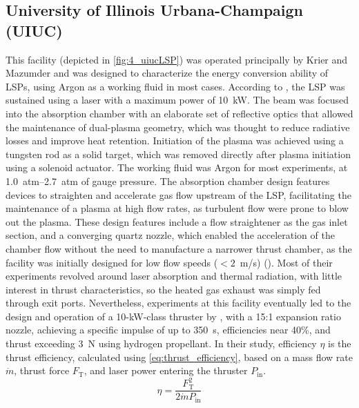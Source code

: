         \subsection{University of Illinois Urbana-Champaign (UIUC)}
            This facility (depicted in \autoref{fig:4_uiucLSP}) was operated principally by Krier and Mazumder and was designed to characterize the energy conversion ability of LSPs, using Argon as a working fluid in most cases. According to \textcite{schwartzLasersustainedGasPlasmas1989}, the LSP was sustained using a  laser with a maximum power of \qty{10}{kW}. The beam was focused into the absorption chamber with an elaborate set of reflective optics that allowed the maintenance of dual-plasma geometry, which was thought to reduce radiative losses and improve heat retention. Initiation of the plasma was achieved using a tungsten rod as a solid target, which was removed directly after plasma initiation using a solenoid actuator. The working fluid was Argon for most experiments, at \qtyrange{1.0}{2.7}{atm} of gauge pressure. The absorption chamber design features devices to straighten and accelerate gas flow upstream of the LSP, facilitating the maintenance of a plasma at high flow rates, as turbulent flow were prone to blow out the plasma. These design features include a flow straightener as the gas inlet section, and a converging quartz nozzle, which enabled the acceleration of the chamber flow without the need to manufacture a narrower thrust chamber, as the facility was initially designed for low flow speeds ($< 2$~m/s) (\textcite{krierEnergyConversionMeasurements1988}). Most of their experiments revolved around laser absorption and thermal radiation, with little interest in thrust characteristics, so the heated gas exhaust was simply fed through exit ports. Nevertheless, experiments at this facility eventually led to the design and operation of a 10-kW-class thruster by \textcite{blackLaserPropulsion10kW1995}, with a 15:1 expansion ratio nozzle, achieving a specific impulse of up to 350~s, efficiencies near 40\%, and thrust exceeding 3~N using hydrogen propellant. In their study, efficiency $\eta$ is the thrust efficiency, calculated using \autoref{eq:thrust_efficiency}, based on a mass flow rate $\dot{m}$, thrust force $F_\mathrm{T}$, and laser power entering the thruster $P_\mathrm{in}$.
            \begin{equation} \label{eq:thrust_efficiency}
                \eta = \frac{F_\mathrm{T}^2}{2\dot{m}P_\mathrm{in}}
            \end{equation}
